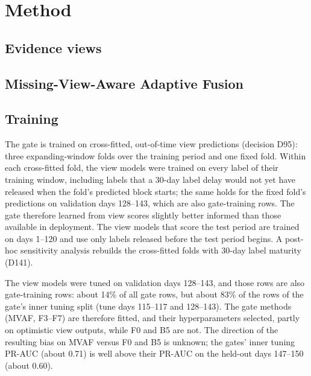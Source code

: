 \section{Method}
\label{sec:method}

\subsection{Evidence views}

\subsection{Missing-View-Aware Adaptive Fusion}

\subsection{Training}

The gate is trained on cross-fitted, out-of-time view predictions (decision D95): three
expanding-window folds over the training period and one fixed fold. Within each cross-fitted
fold, the view models were trained on every label of their training window, including labels
that a 30-day label delay would not yet have released when the fold's predicted block starts;
the same holds for the fixed fold's predictions on validation days 128--143, which are also
gate-training rows. The gate therefore learned from view scores slightly better informed than
those available in deployment. The view models that score the test period are trained on days
1--120 and use only labels released before the test period begins. A post-hoc sensitivity
analysis rebuilds the cross-fitted folds with 30-day label maturity (D141).

The view models were tuned on validation days 128--143, and those rows are also gate-training
rows: about 14\% of all gate rows, but about 83\% of the rows of the gate's inner tuning split
(tune days 115--117 and 128--143). The gate methods (MVAF, F3--F7) are therefore fitted, and
their hyperparameters selected, partly on optimistic view outputs, while F0 and B5 are not. The
direction of the resulting bias on MVAF versus F0 and B5 is unknown; the gates' inner tuning
PR-AUC (about 0.71) is well above their PR-AUC on the held-out days 147--150 (about 0.60).


